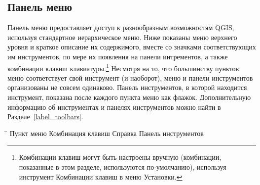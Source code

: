 \subsection{Панель меню}\label{label_menubar}

Панель меню предоставляет доступ к разнообразным возможностям QGIS,
используя стандартное иерархическое меню. Ниже показаны меню верхнего уровня
и краткое описание их содержимого, вместе со значками соответствующих им
инструментов, по мере их появления на панели интрементов, а также комбинации
клавиш клавиатуры.\footnote{Комбинации клавиш могут быть настроены вручную
(комбинации, показанные в этом разделе, используются по-умолчанию),
используя инструмент Комбинации клавиш в меню Установки.}
Несмотря на то, что большинству пунктов меню соответствует свой инструмент
(и наоборот), меню и панели инструментов организованы не совсем одинаково.
Панель инструментов, в которой находится инструмент, показана после каждого
пункта меню как флажок. Дополнительную информацию об инструментах
и панелях инструментов можно найти в Разделе~\ref{label_toolbars}.

\begin{tabbing}
\hspace{5.5cm}\=\hspace{3cm}\=\hspace{3.5cm}\= \kill
\hspace{1cm} Пункт меню \> Комбинация клавиш \> Справка \> Панель инструментов\\
\end{tabbing}

